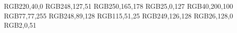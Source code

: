 \usepackage{tikz}
\usepackage{pgfplots}
\pgfplotsset{compat=1.18}
\usepackage{amsmath}
\usepackage{amssymb}
\usepackage{dsfont}
\usepackage{subcaption}


\definecolor{bar}      {RGB}{220,40,0}
\definecolor{crook}    {RGB}{248,127,51}
\definecolor{crown}    {RGB}{250,165,178}
\definecolor{sphinx}   {RGB}{25,0,127}
\definecolor{snake}    {RGB}{40,200,100}
\definecolor{yacht}    {RGB}{77,77,255}
\definecolor{chevron}  {RGB}{248,89,128}
\definecolor{signpost} {RGB}{115,51,25}
\definecolor{lobster}  {RGB}{249,126,128}
\definecolor{hook}     {RGB}{26,128,0}
\definecolor{hexagon}  {RGB}{2,0,51}


\newcommand{\set}[1]{\{#1\}}

\DeclareMathOperator{\rmd}{d}
\DeclareMathOperator{\abs}{abs}

\edef\sqthreeotwo{\pgfmathresult}

\def\eisToCar#1#2{
  \edef\a{#1}
  \edef\b{#2}
  \pgfmathparse{-\b/2}
  \edef\bwRe{\pgfmathresult}
  \pgfmathparse{\b*\sqthreeotwo}
  \edef\bwIm{\pgfmathresult}
  \pgfmathparse{\a+\bwRe}
  \xdef\currX{\pgfmathresult}
  \xdef\currY{\bwIm}%
}

\def\rotateNinety#1#2{ 
  \edef\x{#1}
  \edef\y{#2}
  \xdef\rotY{#1}
  \pgfmathparse{-#2}
  \xdef\rotX{\pgfmathresult}
  }

\gdef\one{1}
\gdef\zero{0}

\def\writeb#1{\pgfmathparse{#1 >= 0}\ifx\pgfmathresult\one+#1\else#1\fi}


\xdef\maxSteps{5}

\xdef\sqthree{\pgfmathresult}

\gdef\testInGrid#1#2#3{
  \pgfmathparse{#1*#2 <= 0}
  \edef\oppSign{\pgfmathresult}
  \ifx\oppSign\one
  \pgfmathparse{abs(#1) + abs(#2)}
  \else\pgfmathparse{max(abs(#1), abs(#2))}
  \fi
  \edef\manhattanDist{\pgfmathresult}
  \pgfmathparse{\manhattanDist <= #3}
  \xdef\withinGrid{\pgfmathresult}
}

